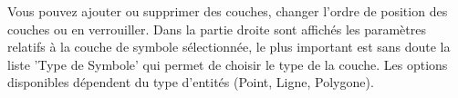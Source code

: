 
Vous pouvez ajouter ou supprimer des couches, changer l'ordre de position des couches ou en verrouiller. Dans la partie droite sont affichés les paramètres relatifs à la couche de symbole sélectionnée, le plus important est sans doute la liste 'Type de Symbole' qui permet de choisir le type de la couche. Les options disponibles dépendent du type d'entités (Point, Ligne, Polygone).

